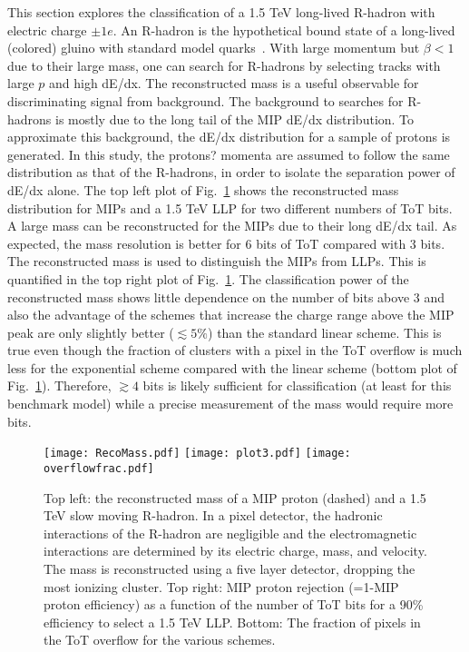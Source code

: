 \documentclass[12pt]{article}
\begin{document}
This section explores the classification of a 1.5 TeV long-lived R-hadron with electric charge $\pm 1e$.  An R-hadron is the hypothetical bound state of a long-lived (colored) gluino with standard model quarks~\cite{Farrar:1978xj}. With large momentum but $\beta<1$ due to their large mass, one can search for R-hadrons by selecting tracks with large $p$ and high dE/dx.  The reconstructed mass is a useful observable for discriminating signal from background. The background to searches for R-hadrons is mostly due to the long tail of the MIP dE/dx distribution. To approximate this background, the dE/dx distribution for a sample of protons is generated. In this study, the protons? momenta are assumed to follow the same distribution as that of the R-hadrons, in order to isolate the separation power of dE/dx alone.  The top left plot of Fig.~\ref{fig:LLP} shows the reconstructed mass distribution for MIPs and a 1.5 TeV LLP for two different numbers of ToT bits.  A large mass can be reconstructed for the MIPs due to their long dE/dx tail.  As expected, the mass resolution is better for 6 bits of ToT compared with 3 bits.  The reconstructed mass is used to distinguish the MIPs from LLPs.  This is quantified in the top right plot of Fig.~\ref{fig:LLP}.   The classification power of the reconstructed mass shows little dependence on the number of bits above 3 and also the advantage of the schemes that increase the charge range above the MIP peak are only slightly better ($\lesssim 5\%$) than the standard linear scheme.   This is true even though the fraction of clusters with a pixel in the ToT overflow is much less for the exponential scheme compared with the linear scheme (bottom plot of Fig.~\ref{fig:LLP}).  Therefore, $\gtrsim 4$ bits is likely sufficient for classification (at least for this benchmark model) while a precise measurement of the mass would require more bits.  

\begin{figure}[h!]
\centering
\texttt{[image: RecoMass.pdf]}
\texttt{[image: plot3.pdf]}
\texttt{[image: overflowfrac.pdf]}
\caption{Top left: the reconstructed mass of a MIP proton (dashed) and a 1.5 TeV slow moving R-hadron.  In a pixel detector, the  hadronic interactions of the R-hadron are negligible and the electromagnetic interactions are determined by its electric charge, mass, and velocity.  The mass is reconstructed using a five layer detector, dropping the most ionizing cluster. Top right: MIP proton rejection (=1-MIP proton efficiency) as a function of the number of ToT bits for a 90\% efficiency to select a 1.5 TeV LLP.  Bottom: The fraction of pixels in the ToT overflow for the various schemes.}
\label{fig:LLP}
\end{figure}
\end{document}
